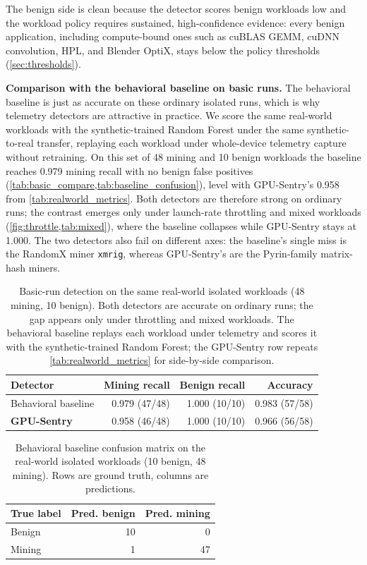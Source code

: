 The benign side is clean because the detector scores benign workloads low and the workload policy requires sustained, high-confidence evidence: every benign application, including compute-bound ones such as cuBLAS GEMM, cuDNN convolution, HPL, and Blender OptiX, stays below the policy thresholds (\cref{sec:thresholds}).

\textbf{Comparison with the behavioral baseline on basic runs.}
The behavioral baseline is just as accurate on these ordinary isolated runs, which is why telemetry detectors are attractive in practice. We score the same real-world workloads with the synthetic-trained Random Forest under the same synthetic-to-real transfer, replaying each workload under whole-device telemetry capture without retraining. On this set of 48 mining and 10 benign workloads the baseline reaches 0.979 mining recall with no benign false positives (\cref{tab:basic_compare,tab:baseline_confusion}), level with GPU-Sentry's 0.958 from \cref{tab:realworld_metrics}. Both detectors are therefore strong on ordinary runs; the contrast emerges only under launch-rate throttling and mixed workloads (\cref{fig:throttle,tab:mixed}), where the baseline collapses while GPU-Sentry stays at 1.000. The two detectors also fail on different axes: the baseline's single miss is the RandomX miner \texttt{xmrig}, whereas GPU-Sentry's are the Pyrin-family matrix-hash miners.

\begin{table}[t]
    \centering
    \caption{Basic-run detection on the same real-world isolated workloads (48 mining, 10 benign). Both detectors are accurate on ordinary runs; the gap appears only under throttling and mixed workloads. The behavioral baseline replays each workload under telemetry and scores it with the synthetic-trained Random Forest; the GPU-Sentry row repeats \cref{tab:realworld_metrics} for side-by-side comparison.}
    \label{tab:basic_compare}
    \begin{tabular}{lrrr}
        \toprule
        Detector & Mining recall & Benign recall & Accuracy \\
        \midrule
        Behavioral baseline & 0.979 (47/48) & 1.000 (10/10) & 0.983 (57/58) \\
        \textbf{GPU-Sentry} & 0.958 (46/48) & 1.000 (10/10) & 0.966 (56/58) \\
        \bottomrule
    \end{tabular}
\end{table}

\begin{table}[t]
    \centering
    \caption{Behavioral baseline confusion matrix on the real-world isolated workloads (10 benign, 48 mining). Rows are ground truth, columns are predictions.}
    \label{tab:baseline_confusion}
    \begin{tabular}{lrr}
        \toprule
        True label & Pred. benign & Pred. mining \\
        \midrule
        Benign & 10 & 0 \\
        Mining & 1 & 47 \\
        \bottomrule
    \end{tabular}
\end{table}

